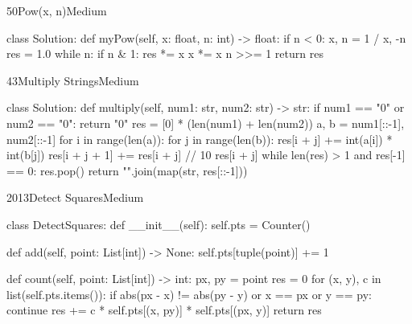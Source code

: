 \begin{problem}{50}{Pow(x, n)}{Medium}
\begin{code}
class Solution:
    def myPow(self, x: float, n: int) -> float:
        if n < 0:
            x, n = 1 / x, -n
        res = 1.0
        while n:
            if n & 1:
                res *= x
            x *= x
            n >>= 1
        return res
\end{code}
\end{problem}

\begin{problem}{43}{Multiply Strings}{Medium}
\begin{code}
class Solution:
    def multiply(self, num1: str, num2: str) -> str:
        if num1 == "0" or num2 == "0":
            return "0"
        res = [0] * (len(num1) + len(num2))
        a, b = num1[::-1], num2[::-1]
        for i in range(len(a)):
            for j in range(len(b)):
                res[i + j] += int(a[i]) * int(b[j])
                res[i + j + 1] += res[i + j] // 10
                res[i + j] %
        while len(res) > 1 and res[-1] == 0:
            res.pop()
        return "".join(map(str, res[::-1]))
\end{code}
\end{problem}

\begin{problem}{2013}{Detect Squares}{Medium}
\begin{code}
class DetectSquares:
    def __init__(self):
        self.pts = Counter()

    def add(self, point: List[int]) -> None:
        self.pts[tuple(point)] += 1

    def count(self, point: List[int]) -> int:
        px, py = point
        res = 0
        for (x, y), c in list(self.pts.items()):
            if abs(px - x) != abs(py - y) or x == px or y == py:
                continue
            res += c * self.pts[(x, py)] * self.pts[(px, y)]
        return res
\end{code}
\end{problem}
